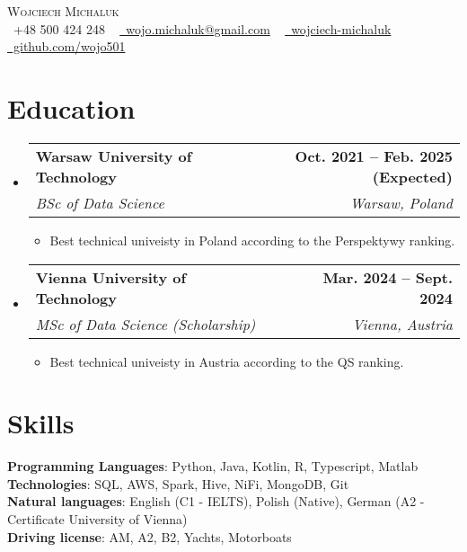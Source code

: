 \documentclass[letterpaper,11pt]{article}
\makeatletter
\newcommand{\resumeItem}[1]{
  \item\small{
    {#1 \vspace{-2pt}}
  }
}
\newcommand{\resumeSubheading}[4]{
  \vspace{-2pt}\item
    \begin{tabular*}{1.0\textwidth}[t]{l@{\extracolsep{\fill}}r}
      \textbf{#1} & \textbf{\small #2} \\
      \textit{\small#3} & \textit{\small #4} \\
    \end{tabular*}\vspace{-7pt}
}
\newcommand{\resumeSubHeadingListStart}{\begin{itemize}[leftmargin=0.0in, label={}]}
\newcommand{\resumeSubHeadingListEnd}{\end{itemize}}
\newcommand{\resumeItemListStart}{\begin{itemize}}
\newcommand{\resumeItemListEnd}{\end{itemize}\vspace{-5pt}}
\makeatother
\begin{document}

\begin{center}
  {\Huge \scshape Wojciech Michaluk} \\[5pt] %
  \small
  \faPhone\ +48 500 424 248 ~ 
  \href{mailto:wojo.michaluk@gmail.com}{\faEnvelope\ wojo.michaluk@gmail.com} ~
  \href{https://www.linkedin.com/in/wojciech-michaluk-a09465269/}{\faLinkedin\ wojciech-michaluk} ~
  \href{https://github.com/wojo501}{\faGithub\ github.com/wojo501} \\[3pt]
\end{center}


\section{Education}
\resumeSubHeadingListStart

\resumeSubheading
{Warsaw University of Technology}{Oct. 2021 -- Feb. 2025 (Expected)}
{BSc of Data Science}{Warsaw, Poland}
\resumeItemListStart
\resumeItem{Best technical univeisty in Poland according to the Perspektywy ranking.}
\resumeItemListEnd

\resumeSubheading
{Vienna University of Technology}{Mar. 2024 -- Sept. 2024}
{MSc of Data Science (Scholarship)}{Vienna, Austria}
\resumeItemListStart
\resumeItem{Best technical univeisty in Austria according to the QS ranking.}
\resumeItemListEnd

\resumeSubHeadingListEnd
\vspace{-16pt}

\section{Skills}
\begin{itemize}[leftmargin=0.15in, label={}]
  \small{\item{
                \textbf{Programming Languages}{: Python, Java, Kotlin, R, Typescript, Matlab} \\
                \textbf{Technologies}{: SQL, AWS, Spark, Hive, NiFi, MongoDB, Git} \\
                \textbf{Natural languages}{: English (C1 - IELTS), Polish (Native), German (A2 - Certificate University of Vienna)} \\
                \textbf{Driving license}{: AM, A2, B2, Yachts, Motorboats}\\
          }}
\end{itemize}
\vspace{-16pt}
\end{document}
